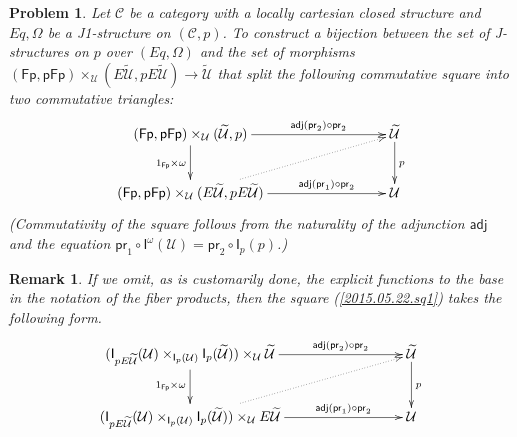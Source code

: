 \documentclass[12pt]{article}
\numberwithin{equation}{section}
\newenvironment{eq}{\begin{equation}}{\end{equation}}
\newtheorem{remark}[proposition]{Remark}
\newtheorem{problem}[proposition]{Problem}
\newcommand{\sr}{\rightarrow}
\newcommand{\wt}{\widetilde}
\newcommand{\C}{{\mathcal C}}  %
\newcommand{\id}{1}            %
\newcommand{\U}{\mathcal{U}}
\newcommand{\I}{\mathsf{I}}
\newcommand{\Fp}{\mathsf{Fp}}
\newcommand{\pFp}{\mathsf{pFp}}
\newcommand{\pr}{\mathsf{pr}}
\newcommand{\adj}{\mathsf{adj}}
\begin{document}
\begin{problem}
\label{2015.05.12.l1} Let $\C$ be a category with a locally cartesian
closed structure and $Eq,\Omega$ be a J1-structure on $({\C},p)$. To
construct a bijection between the set of J-structures on $p$ over $(Eq,\Omega)$
and the set of morphisms $(\Fp,\pFp)\times_\U(E\wt{\U},pE\wt{\U})\sr \wt{\U}$ that
split the following commutative square into two commutative triangles:
%
\begin{eq}\label{2015.05.22.sq1}
\begin{xy}
  \xymatrix@C=7pc{
    (\Fp,\pFp)\times_\U(\wt{\U},p) \ar[r]^-{\adj(\pr_2)\circ \pr_2} \ar[d]_{\id_{\Fp}\times \omega} & \wt{\U} \ar[d]^{p} \\
    (\Fp,\pFp)\times_\U(E\wt{\U},pE\wt{\U}) \ar[r]^-{\adj(\pr_1)\circ \pr_2} \ar@{.>}[ur]           & \U
          }
\end{xy}
\end{eq}%
(Commutativity of the square follows from the naturality of the adjunction $\adj$ and
the equation $\pr_1 \circ \I^\omega(\U) = \pr_2 \circ \I_p(p)$.)
\end{problem}
%
\begin{remark}\rm
If we omit, as is customarily done, the explicit functions to the base in the
notation of the fiber products, then the square (\ref{2015.05.22.sq1}) takes the
following form.
%
\begin{eq}\label{2017.08.16.sq1}
\begin{xy}
          \xymatrix@C=7pc{ (\I_{pE\wt{\U}}(\U)\times_{\I_p(\U)}
            \I_p(\wt{\U}))\times_\U\wt{\U} \ar[r]^-{\adj(\pr_2)\circ \pr_2}
            \ar[d]_{\id_{\Fp}\times \omega} & \wt{\U}
            \ar[d]^{p}\\ (\I_{pE\wt{\U}}(\U)\times_{\I_p(\U)} \I_p(\wt{\U}))\times_\U
            E\wt{\U} \ar[r]^-{\adj(\pr_1)\circ \pr_2} \ar@{.>}[ur] & \U }
\end{xy}
\end{eq}%




\end{remark}
%
\end{document}
